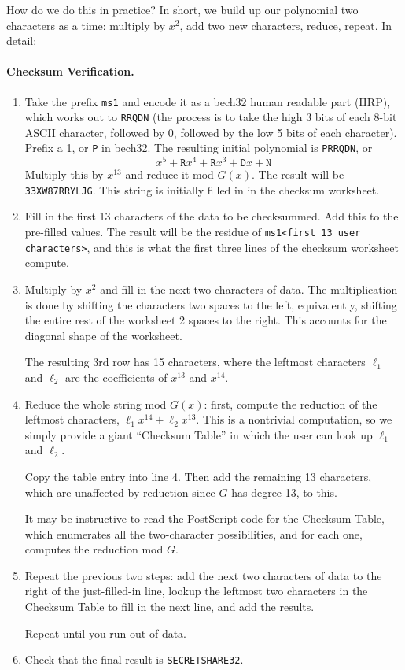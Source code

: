 \documentclass[letterpaper]{article}
\newcommand{\vc}[1]{\texttt{#1}} %
\begin{document}
How do we do this in practice? In short, we build up our polynomial two characters
as a time: multiply by $x^2$, add two new characters, reduce, repeat. In detail:

\paragraph{Checksum Verification.}

\begin{enumerate}
\item Take the prefix \vc{ms1} and encode it as a bech32 human readable part (HRP),
which works out to \vc{RRQDN} (the process is to take the high 3 bits of each
8-bit ASCII character, followed by 0, followed by the low 5 bits of each character).
Prefix a 1, or \vc{P} in bech32. The resulting initial polynomial is \vc{PRRQDN}, or
\[ x^5 + \vc{R}x^4 + \vc{R}x^3 + \vc{D}x + \vc{N} \]
Multiply this by $x^{13}$ and reduce it mod $G(x)$. The result will be
\vc{33XW87RRYLJG}. This string is initially filled in in the checksum
worksheet.

\item Fill in the first 13 characters of the data to be checksummed. Add this to
the pre-filled values. The result will be the residue of \vc{ms1<first 13 user characters>},
and this is what the first three lines of the checksum worksheet compute.

\item Multiply by $x^2$ and fill in the next two characters of data. The multiplication
is done by shifting the characters two spaces to the left, equivalently, shifting the
entire rest of the worksheet 2 spaces to the right. This accounts for the diagonal
shape of the worksheet.

The resulting 3rd row has 15 characters, where the leftmost characters $\ell_1$
and $\ell_2$ are the coefficients of $x^{13}$ and $x^{14}$.

\item Reduce the whole string mod $G(x)$: first, compute the reduction of the
leftmost characters, $\ell_1x^{14} + \ell_2x^{13}$. This is a nontrivial
computation, so we simply provide a giant ``Checksum Table'' in which the user
can look up $\ell_1$ and $\ell_2$.

Copy the table entry into line 4. Then add the remaining 13 characters, which
are unaffected by reduction since $G$ has degree 13, to this.

It may be instructive to read the PostScript code for the Checksum Table, which
enumerates all the two-character possibilities, and for each one, computes
the reduction mod $G$.

\item Repeat the previous two steps: add the next two characters of data to the
right of the just-filled-in line, lookup the leftmost two characters in the
Checksum Table to fill in the next line, and add the results.

Repeat until you run out of data.
\item Check that the final result is \vc{SECRETSHARE32}.
\end{enumerate}
\end{document}
